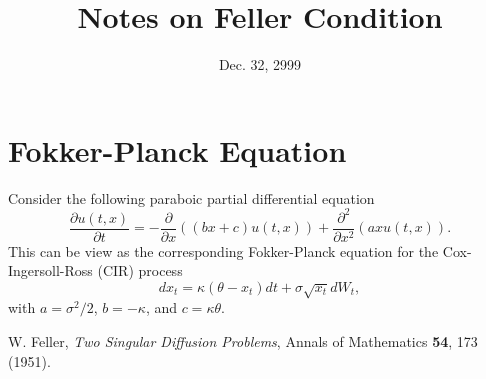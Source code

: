 \documentclass[12pt]{article}
\begin{document}
\title{Notes on Feller Condition}
\date{Dec. 32, 2999}

\maketitle

\section{Fokker-Planck Equation}

  Consider the following paraboic partial differential equation
  \begin{equation}
    \frac{\partial u(t,x)}{\partial t} = -\frac{\partial}{\partial x}\left((bx+c)u(t,x)\right)
                                       + \frac{\partial^2}{\partial x^2}\left(axu(t,x)\right).
  \end{equation}
  This can be view as the corresponding Fokker-Planck equation for the Cox-Ingersoll-Ross (CIR)
  process
  \begin{equation}
    dx_t=\kappa(\theta-x_t)dt + \sigma\sqrt{x_t}dW_t,
  \end{equation}
  with $a=\sigma^2/2$, $b=-\kappa$, and $c=\kappa\theta$.




\begin{thebibliography}{99}
    W. Feller, {\it Two Singular Diffusion Problems}, Annals of Mathematics {\bf 54}, 173 (1951).

\end{thebibliography}
\end{document}
